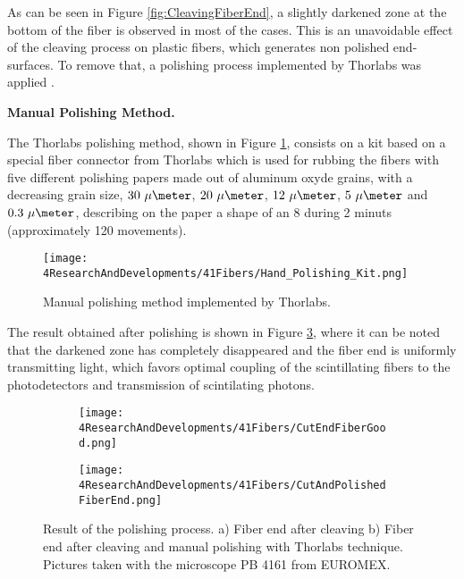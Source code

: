 As can be seen in Figure \ref{fig:CleavingFiberEnd}, a slightly darkened zone at the bottom of the fiber is observed in most of the cases. This is an unavoidable effect of the cleaving process on plastic fibers, which generates non polished end-surfaces. To remove that, a polishing process implemented by Thorlabs was applied \cite{DiamondThorlabs}. 

\textbf{Manual Polishing Method.}

The Thorlabs polishing method, shown in Figure \ref{fig:HandPolishingMethod}, consists on a kit based on a special fiber connector from Thorlabs which is used for rubbing the fibers with five different polishing papers made out of aluminum  oxyde grains, with a decreasing grain size, $30~\mu\meter$, $20~\mu\meter$, $12~\mu\meter$, $5~\mu\meter$ and $0.3~\mu\meter$, describing on the paper a shape of an 8 during 2 minuts (approximately 120 movements). 

\begin{figure}[h]
\centering
\texttt{[image: 4ResearchAndDevelopments/41Fibers/Hand\_Polishing\_Kit.png]}
\caption{Manual polishing method implemented by Thorlabs.\label{fig:HandPolishingMethod}}
\end{figure}

The result obtained after polishing is shown in Figure \ref{subfig:PolishFiberEnd}, where it can be noted that the darkened zone has completely disappeared and the fiber end is uniformly transmitting light, which favors optimal coupling of the scintillating fibers to the photodetectors and transmission of scintilating photons.

\begin{figure}
\centering
    \begin{subfigure}[b]{0.5\textwidth}
    \centering
    \texttt{[image: 4ResearchAndDevelopments/41Fibers/CutEndFiberGood.png]}  
    \caption{\label{subfig:CleaveFiberEnd}}
    \end{subfigure}
    \hfill
    \begin{subfigure}[b]{0.45\textwidth}
    \centering
    \texttt{[image: 4ResearchAndDevelopments/41Fibers/CutAndPolishedFiberEnd.png]}  
    \caption{\label{subfig:PolishFiberEnd}}
    \end{subfigure}
 \caption{Result of the polishing process. a) Fiber end after cleaving b) Fiber end after cleaving and manual polishing with Thorlabs technique. Pictures taken with the microscope PB 4161 from EUROMEX.}
 \label{fig:ResultofPolishingProcess}
\end{figure}

